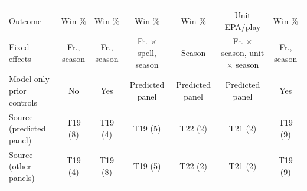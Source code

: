 \begin{table}[H]
{\begin{tabular}[t]{lcccccc}
\addlinespace[0.3em]
\multicolumn{7}{l}{\textbf{Specification}}\\
\hspace{1em}Outcome & Win \% & Win \% & Win \% & Win \% & Unit EPA/play & Win \%\\
\hspace{1em}Fixed effects & Fr., season & Fr., season & Fr. $\times$ spell, season & Season & Fr. $\times$ season, unit $\times$ season & Fr., season\\
\hspace{1em}Model-only prior controls & No & Yes & Predicted panel & Predicted panel & Predicted panel & Yes\\
\hspace{1em}Source (predicted panel) & T19 (8) & T19 (4) & T19 (5) & T22 (2) & T21 (2) & T19 (9)\\
\hspace{1em}Source (other panels) & T19 (4) & T19 (8) & T19 (5) & T22 (2) & T21 (2) & T19 (9)\\
\bottomrule
\end{tabular}}
\end{table}

